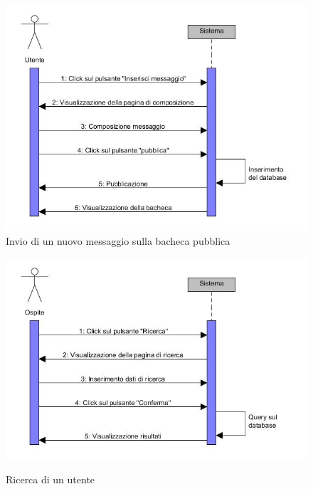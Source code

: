 \documentclass[a4paper,12pt]{article}
\begin{document}
\begin{figure}
\centering
\includegraphics[scale=0.70]{sDiagrams/creazioneThread.jpg} \\
\caption{\label{creazioneThread} Invio di un nuovo messaggio sulla bacheca pubblica}
\vspace{0.5cm}
\includegraphics[scale=0.70]{sDiagrams/ricercaUtenti.jpg} \\
\caption{\label{ricercaUtenti} Ricerca di un utente}
\end{figure}
\end{document}
